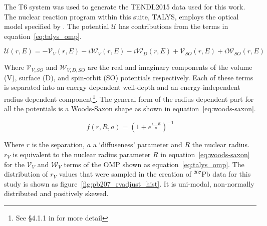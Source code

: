 The T6 system was used to generate the TENDL2015 data used for this work. The nuclear reaction program within this suite, TALYS, employs the optical model specified by \citeauthor{Koning2003}. The potential $\mathcal{U}$ has contributions from the terms in equation~\ref{eq:talys_omp}. 

\begin{equation}
  \mathcal{U}(r,E) = - \mathcal{V}_{V}(r,E) - i\mathcal{W}_{V}(r,E) - i\mathcal{W}_{D}(r,E) + \mathcal{V}_{SO}(r,E) + i\mathcal{W}_{SO}(r,E)
  \label{eq:talys_omp}
\end{equation}

Where $\mathcal{V}_{V,SO}$ and $\mathcal{W}_{V,D,SO}$ are the real and imaginary components of the volume (V), surface (D), and spin-orbit (SO) potentials respectively. Each of these terms is separated into an energy dependent well-depth and an energy-independent radius dependent component\footnote{See §4.1.1 in \cite{TALYS2017} for more detail}. The general form of the radius dependent part for all the potentials is a Woods-Saxon shape \cite{Woods1954} as shown in equation~\ref{eq:woods-saxon}.

\begin{equation}
  \label{eq:woods-saxon}
  f(r,R,a) = \left(1 + e^{\frac{r-R}{a}}\right)^{-1}
\end{equation}

Where $r$ is the separation, $a$ a `diffuseness' parameter and $R$ the nuclear radius. $r_{V}$ is equivalent to the nuclear radius parameter $R$ in equation~\ref{eq:woods-saxon} for the $\mathcal{V}_{V}$ and $\mathcal{W}_{V}$ terms of the OMP shown as equation~\ref{eq:talys_omp}. The distribution of $r_{V}$ values that were sampled in the creation of $^{207}$Pb data for this study is shown as figure~\ref{fig:pb207_rvadjust_hist}. It is uni-modal, non-normally distributed and positively skewed. 

